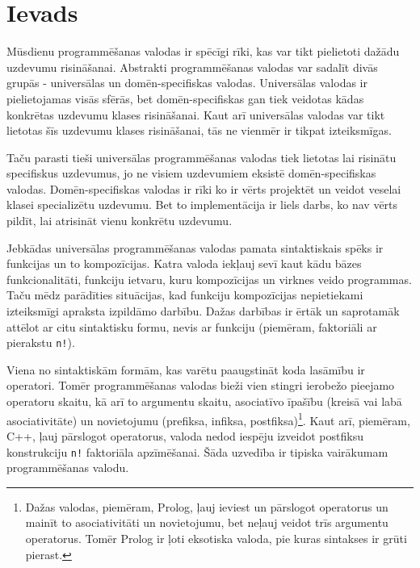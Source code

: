 \section{\label{s:introduction}Ievads}

Mūsdienu programmēšanas valodas ir spēcīgi rīki, kas var tikt pielietoti dažādu uzdevumu risināšanai. Abstrakti programmēšanas valodas var sadalīt divās grupās - universālas un domēn-specifiskas valodas. Universālas valodas ir pielietojamas visās sfērās, bet domēn-specifiskas gan tiek veidotas kādas konkrētas uzdevumu klases risināšanai. Kaut arī universālas valodas var tikt lietotas šīs uzdevumu klases risināšanai, tās ne vienmēr ir tikpat izteiksmīgas.

Taču parasti tieši universālas programmēšanas valodas tiek lietotas lai risinātu specifiskus uzdevumus, jo ne visiem uzdevumiem eksistē domēn-specifiskas valodas. Domēn-specifiskas valodas ir rīki ko ir vērts projektēt un veidot veselai klasei specializētu uzdevumu. Bet to implementācija ir liels darbs, ko nav vērts pildīt, lai atrisināt vienu konkrētu uzdevumu.

Jebkādas universālas programmēšanas valodas pamata sintaktiskais spēks ir funkcijas un to kompozīcijas. Katra valoda iekļauj sevī kaut kādu bāzes funkcionalitāti, funkciju ietvaru, kuru kompozīcijas un virknes veido programmas. Taču mēdz parādīties situācijas, kad funkciju kompozīcijas nepietiekami izteiksmīgi apraksta izpildāmo darbību. Dažas darbības ir ērtāk un saprotamāk attēlot ar citu sintaktisku formu, nevis ar funkciju (piemēram, faktoriāli ar pierakstu \verb|n!|).

Viena no sintaktiskām formām, kas varētu paaugstināt koda lasāmību ir operatori. Tomēr programmēšanas valodas bieži vien stingri ierobežo pieejamo operatoru skaitu, kā arī to argumentu skaitu, asociatīvo īpašību (kreisā vai labā asociativitāte) un novietojumu (prefiksa, infiksa, postfiksa)\footnote{Dažas valodas, piemēram, Prolog, ļauj ieviest un pārslogot operatorus un mainīt to asociativitāti un novietojumu, bet neļauj veidot trīs argumentu operatorus. Tomēr Prolog ir ļoti eksotiska valoda, pie kuras sintakses ir grūti pierast.\cite{PrologStandard}}. Kaut arī, piemēram, C++, ļauj pārslogot operatorus, valoda nedod iespēju izveidot postfiksu konstrukciju \verb|n!| faktoriāla apzīmēšanai. Šāda uzvedība ir tipiska vairākumam programmēšanas valodu. %

